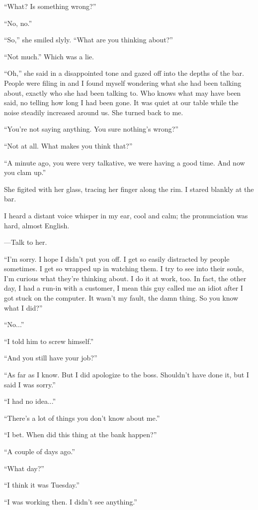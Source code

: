 \documentclass[
]{article}
\begin{document}
``What? Is something wrong?''

``No, no.''

``So,'' she smiled slyly. ``What are you thinking about?''

``Not much.'' Which was a lie.

``Oh,'' she said in a disappointed tone and gazed off into the depths of
the bar. People were filing in and I found myself wondering what she had
been talking about, exactly who she had been talking to. Who knows what
may have been said, no telling how long I had been gone. It was quiet at
our table while the noise steadily increased around us. She turned back
to me.

``You're not saying anything. You sure nothing's wrong?''

``Not at all. What makes you think that?''

``A minute ago, you were very talkative, we were having a good time. And
now you clam up.''

She figited with her glass, tracing her finger along the rim. I stared
blankly at the bar.

I heard a distant voice whisper in my ear, cool and calm; the
pronunciation was hard, almost English.

---Talk to her.

``I'm sorry. I hope I didn't put you off. I get so easily distracted by
people sometimes. I get so wrapped up in watching them. I try to see
into their souls, I'm curious what they're thinking about. I do it at
work, too. In fact, the other day, I had a run-in with a customer, I
mean this guy called me an idiot after I got stuck on the computer. It
wasn't my fault, the damn thing. So you know what I did?''

``No...''

``I told him to screw himself.''

``And you still have your job?''

``As far as I know. But I did apologize to the boss. Shouldn't have done
it, but I said I was sorry.''

``I had no idea...''

``There's a lot of things you don't know about me.''

``I bet. When did this thing at the bank happen?''

``A couple of days ago.''

``What day?''

``I think it was Tuesday.''

``I was working then. I didn't see anything.''
\end{document}
